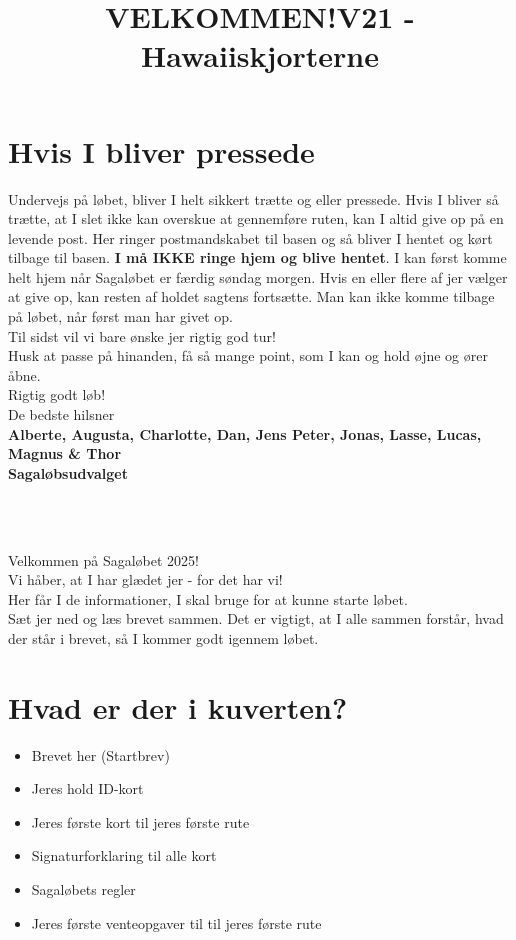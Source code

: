 \section{Hvis I bliver pressede}
Undervejs på løbet, bliver I helt sikkert trætte og eller pressede. Hvis I bliver så trætte, at I slet ikke kan overskue at gennemføre ruten, kan I altid give op på en levende post. Her ringer postmandskabet til basen og så bliver I hentet og kørt tilbage til basen. \textbf{I må IKKE ringe hjem og blive hentet}. I kan først komme helt hjem når Sagaløbet er færdig søndag morgen. Hvis en eller flere af jer vælger at give op, kan resten af holdet sagtens fortsætte. Man kan ikke komme tilbage på løbet, når først man har givet op.\\
\newline
Til sidst vil vi bare ønske jer rigtig god tur!\\
Husk at passe på hinanden, få så mange point, som I kan og hold øjne og ører åbne.\\
\newline
Rigtig godt løb!\\
\newline
\textcolor{søblå}{De bedste hilsner}\\
\textcolor{natblå}{\textbf{Alberte, Augusta, Charlotte, Dan, Jens Peter, Jonas, Lasse, Lucas, Magnus \& Thor}}\\
\textcolor{natblå}{\textbf{Sagaløbsudvalget}}\\
\newpage
\title{VELKOMMEN!}\\
\newline
\title{\textcolor{søblå}{V21 - Hawaiiskjorterne }}\\
\newline
Velkommen på Sagaløbet 2025!\\
Vi håber, at I har glædet jer - for det har vi!\\
Her får I de informationer, I skal bruge for at kunne starte løbet.\\
Sæt jer ned og læs brevet sammen. Det er vigtigt, at I alle sammen forstår, hvad der står i brevet, så I kommer godt igennem løbet.
\section{Hvad er der i kuverten?}
\begin{itemize}
    \item Brevet her (Startbrev)
    \item Jeres hold ID-kort
    \item Jeres første kort til jeres første rute
    \item Signaturforklaring til alle kort
    \item Sagaløbets regler
    \item Jeres første venteopgaver til til jeres første rute
\end{itemize}
